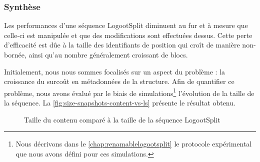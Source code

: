 \subsubsection{Synthèse}

Les performances d'une séquence LogootSplit diminuent au fur et à mesure que celle-ci est manipulée et que des modifications sont effectuées dessus.
Cette perte d'efficacité est dûe à la taille des identifiants de position qui croît de manière non-bornée, ainsi qu'au nombre généralement croissant de blocs.

Initialement, nous nous sommes focalisés sur un aspect du problème : la croissance du surcoût en métadonnées de la structure.
Afin de quantifier ce problème, nous avons évalué par le biais de simulations\footnote{Nous décrivons dans le \autoref{chap:renamablelogootsplit} le protocole expérimental que nous avons défini pour ces simulations.} l'évolution de la taille de la séquence.
La \autoref{fig:size-snapshots-content-vs-ls} présente le résultat obtenu.

\begin{figure}[!ht]

  \centering
  \caption{Taille du contenu comparé à la taille de la séquence LogootSplit}
  \label{fig:size-snapshots-content-vs-ls}
\end{figure}

